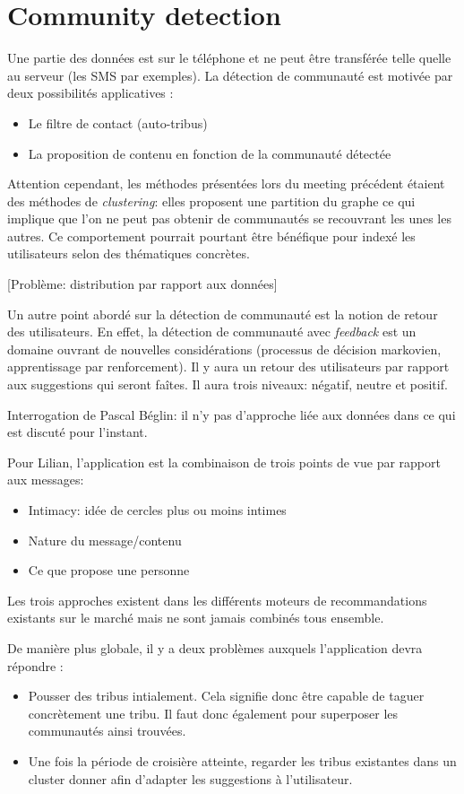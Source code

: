 \documentclass[a4paper]{article}
\begin{document}
\section*{Community detection}
\label{sec:Community detection}
Une partie des données est sur le téléphone et ne peut être transférée telle
quelle au serveur (les SMS par exemples).
La détection de communauté est motivée par deux possibilités applicatives :
\begin{itemize}
    \item Le filtre de contact (auto-tribus)
    \item La proposition de contenu en fonction de la communauté détectée
\end{itemize}
Attention cependant, les méthodes présentées lors du meeting précédent étaient
des méthodes de \emph{clustering}: elles proposent une partition du graphe ce
qui implique que l'on ne peut pas obtenir de communautés se recouvrant les unes
les autres. Ce comportement pourrait pourtant être bénéfique pour indexé les
utilisateurs selon des thématiques concrètes.

[Problème: distribution par rapport aux données]

Un autre point abordé sur la détection de communauté est la notion de retour
des utilisateurs. En effet, la détection de communauté avec \emph{feedback} est
un domaine ouvrant de nouvelles considérations (processus de décision
markovien, apprentissage par renforcement). Il y aura un retour des
utilisateurs par rapport aux suggestions qui seront faîtes. Il aura trois
niveaux: négatif, neutre et positif.

Interrogation de Pascal Béglin: il n'y pas d'approche liée aux données dans ce
qui est discuté pour l'instant.

Pour Lilian, l'application est la combinaison de trois points de vue par
rapport aux messages:
\begin{itemize}
    \item Intimacy: idée de cercles plus ou moins intimes
    \item Nature du message/contenu
    \item Ce que propose une personne
\end{itemize}
Les trois approches existent dans les différents moteurs de recommandations
existants sur le marché mais ne sont jamais combinés tous ensemble.

De manière plus globale, il y a deux problèmes auxquels l'application devra
répondre :
\begin{itemize}
    \item Pousser des tribus intialement. Cela signifie donc être capable de
        taguer concrètement une tribu. Il faut donc également pour superposer
        les communautés ainsi trouvées.
    \item Une fois la période de croisière atteinte, regarder les tribus
        existantes dans un cluster donner afin d'adapter les suggestions à
        l'utilisateur.
\end{itemize}
\end{document}
